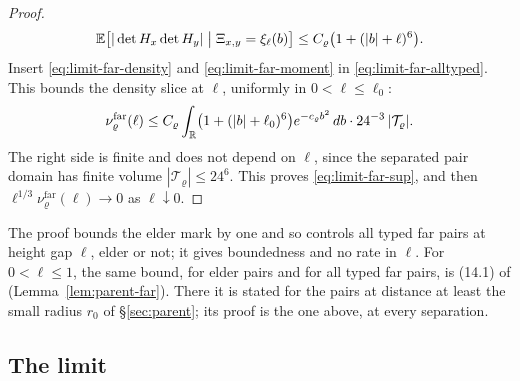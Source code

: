 \begin{proof}
\begin{equation}\label{eq:limit-far-moment}
\mathbb E\bigl[|\det H_x\det H_y|\bigm|\Xi_{x,y}=\xi_\ell(b)\bigr]\le C_\varrho\bigl(1+(|b|+\ell)^6\bigr).
\end{equation}
Insert \eqref{eq:limit-far-density} and \eqref{eq:limit-far-moment} in \eqref{eq:limit-far-alltyped}. This bounds the density slice at $\ell$, uniformly in $0<\ell\le\ell_0$:
\begin{equation}\label{eq:limit-far-final}
\nu^{\mathrm{far}}_\varrho(\ell)\le C_\varrho\int_{\mathbb R}\bigl(1+(|b|+\ell_0)^6\bigr)e^{-c_\varrho b^2}\,db\cdot24^{-3}\,|\mathcal T_\varrho| .
\end{equation}
The right side is finite and does not depend on $\ell$, since the separated pair domain has finite volume $|\mathcal T_\varrho|\le24^6$. This proves \eqref{eq:limit-far-sup}, and then $\ell^{1/3}\nu^{\mathrm{far}}_\varrho(\ell)\to0$ as $\ell\downarrow0$.
\end{proof}

The proof bounds the elder mark by one and so controls all typed far pairs at height gap $\ell$, elder or not; it gives boundedness and no rate in $\ell$. For $0<\ell\le1$, the same bound, for elder pairs and for all typed far pairs, is (14.1) of \cite{parentP} (Lemma~\ref{lem:parent-far}). There it is stated for the pairs at distance at least the small radius $r_0$ of \S\ref{sec:parent}; its proof is the one above, at every separation.

\subsection*{The limit}

